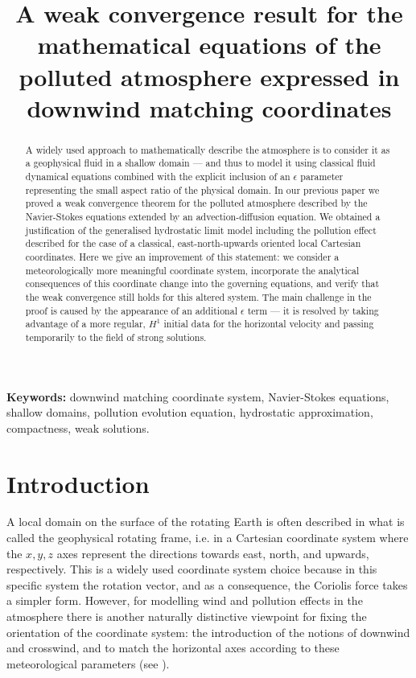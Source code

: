 \documentclass[11pt]{article}
\title{A weak convergence result for the mathematical equations of the polluted atmosphere expressed in downwind matching coordinates}
\date{}
\begin{document}
\maketitle

\begin{abstract}

A widely used approach to mathematically describe the atmosphere is to consider it as a geophysical fluid in a shallow domain --- and thus to model it using classical fluid dynamical equations combined with the explicit inclusion of an $\epsilon$ parameter representing the small aspect ratio of the physical domain. In our previous paper \cite{pollatmws2019} we proved a weak convergence theorem for the polluted atmosphere described by the Navier-Stokes equations extended by an advection-diffusion equation. We obtained a justification of the generalised hydrostatic limit model including the pollution effect described for the case of a classical, east-north-upwards oriented local Cartesian coordinates. Here we give an improvement of this statement: we consider a meteorologically more meaningful coordinate system, incorporate the analytical consequences of this coordinate change into the governing equations, and verify that the weak convergence still holds for this altered system. The main challenge in the proof is caused by the appearance of an additional $\epsilon$ term --- it is resolved by taking advantage of a more regular, $H^1$ initial data for the horizontal velocity and passing temporarily to the field of strong solutions.

\end{abstract}

{\bf Keywords:} downwind matching coordinate system, Navier-Stokes equations, shallow domains, pollution evolution equation, hydrostatic approximation, compactness, weak solutions.

\newpage

\tableofcontents
\newpage

\section{Introduction} \label{Introduction}

A local domain on the surface of the rotating Earth is often described in what is called the geophysical rotating frame, i.e. in a Cartesian coordinate system where the $x, y, z$ axes represent the directions towards east, north, and upwards, respectively. This is a widely used coordinate system choice because in this specific system the rotation vector, and as a consequence, the Coriolis force takes a simpler form. However, for modelling wind and pollution effects in the atmosphere there is another naturally distinctive viewpoint for fixing the orientation of the coordinate system: the introduction of the notions of downwind and crosswind, and to match the horizontal axes according to these meteorological parameters (see \cite{goyal2011mathematical}).
\end{document}
